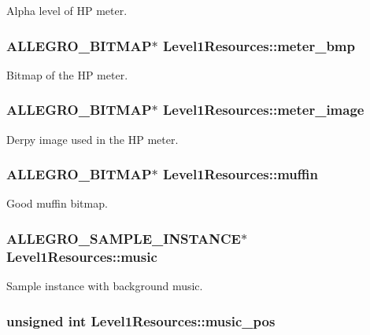 Alpha level of H\+P meter. \hypertarget{structLevel1Resources_a78bf6a1a29de8408aa80aa903e0c5744}{
\subsubsection[{meter\+\_\+bmp}]{\setlength{\rightskip}{0pt plus 5cm}A\+L\+L\+E\+G\+R\+O\+\_\+\+B\+I\+T\+M\+A\+P$\ast$ Level1\+Resources\+::meter\+\_\+bmp}}\label{structLevel1Resources_a78bf6a1a29de8408aa80aa903e0c5744}
Bitmap of the H\+P meter. \hypertarget{structLevel1Resources_a6e3188d36fbe54743b6f3c46c8168d06}{
\subsubsection[{meter\+\_\+image}]{\setlength{\rightskip}{0pt plus 5cm}A\+L\+L\+E\+G\+R\+O\+\_\+\+B\+I\+T\+M\+A\+P$\ast$ Level1\+Resources\+::meter\+\_\+image}}\label{structLevel1Resources_a6e3188d36fbe54743b6f3c46c8168d06}
Derpy image used in the H\+P meter. \hypertarget{structLevel1Resources_aa70c6410bb1e6634f577e1360c698a43}{
\subsubsection[{muffin}]{\setlength{\rightskip}{0pt plus 5cm}A\+L\+L\+E\+G\+R\+O\+\_\+\+B\+I\+T\+M\+A\+P$\ast$ Level1\+Resources\+::muffin}}\label{structLevel1Resources_aa70c6410bb1e6634f577e1360c698a43}
Good muffin bitmap. \hypertarget{structLevel1Resources_a328f872b3a4a75a3f0c1c4a081d231ea}{
\subsubsection[{music}]{\setlength{\rightskip}{0pt plus 5cm}A\+L\+L\+E\+G\+R\+O\+\_\+\+S\+A\+M\+P\+L\+E\+\_\+\+I\+N\+S\+T\+A\+N\+C\+E$\ast$ Level1\+Resources\+::music}}\label{structLevel1Resources_a328f872b3a4a75a3f0c1c4a081d231ea}
Sample instance with background music. \hypertarget{structLevel1Resources_a312c499697c6245f45a556d91e541f02}{
\subsubsection[{music\+\_\+pos}]{\setlength{\rightskip}{0pt plus 5cm}unsigned int Level1\+Resources\+::music\+\_\+pos}}\label{structLevel1Resources_a312c499697c6245f45a556d91e541f02}
